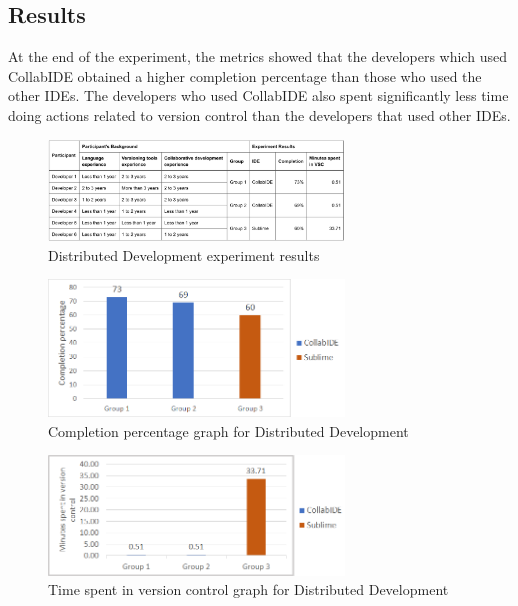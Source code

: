 	

\subsection{Results}

At the end of the experiment, the metrics showed that the developers which used CollabIDE obtained 
a higher completion percentage than those who used the other IDEs. The developers who used 
CollabIDE also spent significantly less time doing actions related to version control than the 
developers that used other IDEs.


\begin{figure}[htbp]
  \centering
  \includegraphics[width=0.7\textwidth]{img/resultsTableCollaborative}
  \caption{Distributed Development experiment results}
  \label{fig:collabide}
\end{figure}

\begin{figure}[htbp]
  \centering
  \includegraphics[width=0.7\textwidth]{img/completionCollaborative}
  \caption{Completion percentage graph for Distributed Development}
  \label{fig:collabide}
\end{figure}

\begin{figure}[htbp]
  \centering
  \includegraphics[width=0.7\textwidth]{img/versionControlCollaborative}
  \caption{Time spent in version control graph for Distributed Development}
  \label{fig:collabide}
\end{figure}

